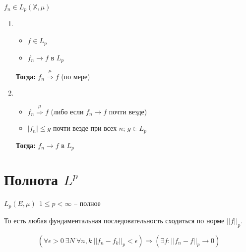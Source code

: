 \documentclass[paper=a4, fontsize=14pt]{report}
\begin{document}
$ f_n \in L_p(\mathbb{X}, \mu)$

\begin{enumerate}
	\item \begin{itemize}
		\item $ f \in L_p $
		\item $ f_n \rightarrow f $ в $ L_p $
	\end{itemize}
	\textbf{Тогда:} $ f_n \stackrel{\mu}{\Rightarrow} f $ (по мере)

	\item \begin{itemize}
		\item $ f_n \stackrel{\mu}{\Rightarrow} f $ (либо если $ f_n \rightarrow f $  почти везде)
		\item $ |f_n| \leq g $ почти везде при всех $n$; $g \in L_p$
	\end{itemize}
	\textbf{Тогда:} $ f_n \rightarrow f $ в $ L_p $
\end{enumerate}

\section{Полнота $L^p$}
$ L_p(E, \mu) ~ ~ 1 \leq p < \infty $ -- полное

То есть любая фундаментальная последовательность сходиться по норме $ ||f||_p $.

$$(\forall \epsilon > 0 ~ \exists N ~ \forall n, k ~ ||f_n - f_k||_p < \epsilon) \Rightarrow (\exists f : ||f_n - f||_p \rightarrow 0)$$
\end{document}
